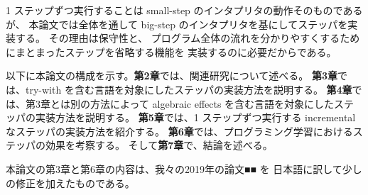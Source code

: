 1 ステップずつ実行することは small-step のインタプリタの動作そのものであるが、
本論文では全体を通して big-step のインタプリタを基にしてステッパを実装する。
その理由は保守性と、
プログラム全体の流れを分かりやすくするためにまとまったステップを省略する機能を
実装するのに必要だからである。

\vspace{1cm}
以下に本論文の構成を示す。{\bf 第2章}では、関連研究について述べる。
{\bf 第3章}では、try-with を含む言語を対象にしたステッパの実装方法を説明する。
{\bf 第4章}では、第3章とは別の方法によって algebraic effects
を含む言語を対象にしたステッパの実装方法を説明する。
{\bf 第5章}では、1 ステップずつ実行する incremental なステッパの実装方法を紹介する。
{\bf 第6章}では、プログラミング学習におけるステッパの効果を考察する。
そして{\bf 第7章}で、結論を述べる。

本論文の第3章と第6章の内容は、我々の2019年の論文■■ \cite{FCA19} を
日本語に訳して少しの修正を加えたものである。
